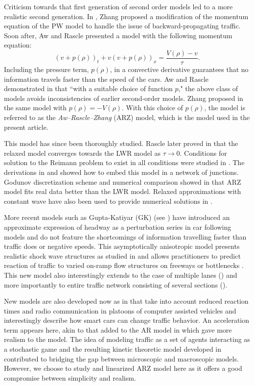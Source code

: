 \documentclass[5p,twocolumn]{elsarticle}
\begin{document}
Criticism towards that first generation of second order models led to a more realistic second generation. In \cite{Zhang1998}, Zhang proposed a modification of the momentum equation of the PW model to handle the issue of backward-propagating traffic. Soon after, Aw and Rascle \cite{AR} presented a model with the following momentum equation:
\begin{equation} \label{ARZEq}
(v+p(\rho))_t+v(v+p(\rho))_x=\frac{V(\rho)-v}{\tau}.
\end{equation}
Including the pressure term, $p(\rho)$, in a convective derivative guarantees that no information travels faster than the speed of the cars. Aw and Rascle demonstrated in \cite{AR} that ``with a suitable choice of function $p$," the above class of models avoids inconsistencies of earlier second-order models. Zhang proposed in \cite{Z} the same model with $p(\rho) = -V(\rho)$. With this choice of $p(\rho)$, the model is referred to as the \textit{Aw--Rascle--Zhang} (ARZ) model, which is the model used in the present article.

This model has since been thoroughly studied. Rascle later proved in \cite{R_improved} that the relaxed model converges towards the LWR model as $\tau \rightarrow 0$. Conditions for solution to the Reimann problem to exist in all conditions were studied in \cite{lebacque2007}. The derivations in \cite{HybridLagrangian2007} and \cite{garavello2006traffic} showed how to embed this model in a network of junctions. Godunov discretization scheme and numerical comparison showed in \cite{GodunovARZ} that ARZ model fits real data better than the LWR model. Relaxed approximations with constant wave have also been used to provide numerical solutions in \cite{Delis2014318}.

More recent models such as Gupta-Katiyar (GK) (see \cite{Gupta2006551}) have introduced an approximate expression of headway as a perturbation series in car following models and do not feature the shortcomings of information travelling faster than traffic does or negative speeds. This asymptotically anisotropic model presents realistic shock wave structures as studied in \cite{Gupta20051} and allows practitioners to predict reaction of traffic to varied on-ramp flow structures on freeways \cite{Gupta2006674} or bottlenecks \cite{Gupta20052}. This new model also interestingly extends to the case of multiple lanes (\cite{Gupta2014}) and more importantly to entire traffic network consisting of several sections (\cite{Gupta20141}).

New models are also developed now as in \cite{jin2014dynamics} that take into account reduced reaction times and radio communication in platoons of computer assisted vehicles and interestingly describe how smart cars can change traffic behavior. An acceleration term appears here, akin to that added to the AR model in \cite{degond2008modelling} which gave more realism to the model. The idea of modeling traffic as a set of agents interacting as a stochastic game and the resulting kinetic theoretic model developed in \cite{bellouquid2012towards} contributed to bridging the gap between microscopic and macroscopic models. However, we choose to study and linearized ARZ model here as it offers a good compromise between simplicity and realism.
\end{document}
